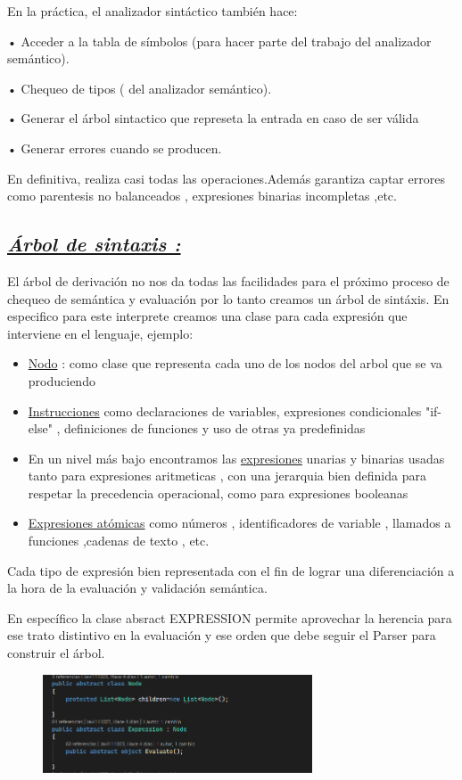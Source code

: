 \documentclass{article}%
\begin{document}
En la práctica, el analizador sintáctico también hace:

• Acceder a la tabla de símbolos (para hacer parte del trabajo del analizador
semántico).

• Chequeo de tipos ( del analizador semántico).

• Generar el árbol sintactico que represeta la entrada en caso de ser válida

• Generar errores cuando se producen.

En definitiva, realiza casi todas las operaciones.Además garantiza captar errores como parentesis no balanceados , expresiones binarias incompletas ,etc.


\subsection{\underline{\emph{Árbol de sintaxis :}}}
El árbol de derivación no nos da todas las facilidades para el próximo proceso de chequeo de semántica y evaluación por lo tanto creamos un árbol de sintáxis.
En especifico para este interprete creamos una clase para cada expresión que interviene en el lenguaje, ejemplo:

\begin{itemize}
    \item \underline{Nodo} : como clase que representa cada uno de los nodos del arbol que se va produciendo
    \item \underline{Instrucciones} como declaraciones de variables, expresiones condicionales "if-else" , definiciones de funciones y uso de otras ya predefinidas
    \item En un nivel más bajo encontramos las \underline{expresiones} unarias y binarias usadas tanto para expresiones aritmeticas , con una jerarquia bien definida para respetar la precedencia operacional, como para expresiones booleanas
    \item \underline{Expresiones atómicas} como números , identificadores de variable , llamados a funciones ,cadenas de texto , etc.
\end{itemize}
Cada tipo de expresión bien representada con el fin de lograr una diferenciación a la hora de la evaluación y validación semántica.

En específico la clase absract EXPRESSION permite aprovechar la herencia para ese trato distintivo en la evaluación y ese orden que debe seguir el Parser para construir el árbol. 
\begin{figure}[h]
  {
        \includegraphics*[width=8cm]{node.png}
  }
\end{figure}
\end{document}
